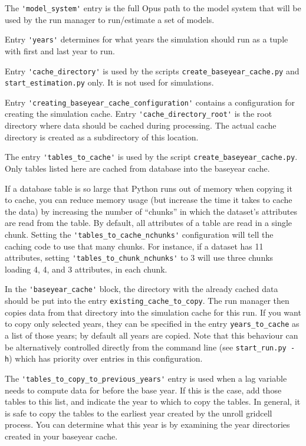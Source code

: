 The \verb|'model_system'| entry is the full Opus path to the model system that
will be used by the run manager to run/estimate a set of models.

Entry \verb|'years'| determines for what
years the simulation should run as a tuple with first and last year to run.

Entry \verb|'cache_directory'| is used by the scripts \verb|create_baseyear_cache.py| and 
\verb|start_estimation.py| only. It is not used for simulations.

Entry \verb|'creating_baseyear_cache_configuration'| contains a configuration
for creating the simulation cache. Entry \verb|'cache_directory_root'| is the root 
directory where data should be
cached during processing. The actual cache directory is created as a subdirectory
of this location. 

The entry \verb|'tables_to_cache'| is used by the script \verb|create_baseyear_cache.py|. 
Only tables listed here are cached from database into the baseyear cache.

If a database table is so large that Python \pythonindex runs out of memory when copying it
to cache, you can reduce memory usage (but increase the time it takes to cache
the data) by increasing the number of ``chunks'' in which the dataset's \datasetindex
attributes are read from the table.  By
default, all attributes of a table are read in a single chunk. Setting the
\verb|'tables_to_cache_nchunks'| configuration  will tell the caching code
to use that many chunks.  For instance, if a dataset has 11 attributes, setting
\verb|'tables_to_chunk_nchunks'| to 3 will use three chunks loading 4, 4, and 3
attributes, in each chunk.

In the \verb|'baseyear_cache'| \baseyearcacheindex block, the directory with the already cached data
should be put into the entry \verb|existing_cache_to_copy|. The run manager \runmanagerindex then
copies data from that directory into the simulation cache \baseyearcacheindex for this run. If you
want to copy only selected years, they can be specified in the entry
\verb|years_to_cache| as a list of those years; by default all years are
copied. Note that this behaviour can be alternatively controlled directly from
the command line (see \verb|start_run.py -h|)
which has priority over entries in this configuration.

The \verb|'tables_to_copy_to_previous_years'| entry is used when a
lag variable needs to compute data for before the base year.  
If this is the case, add those
tables to this list, and indicate the year to which
to copy the tables.  In general, it is safe to copy the tables to the earliest
year created by the unroll gridcell process.  You can determine what this year
is by examining the year directories created in your baseyear cache.

